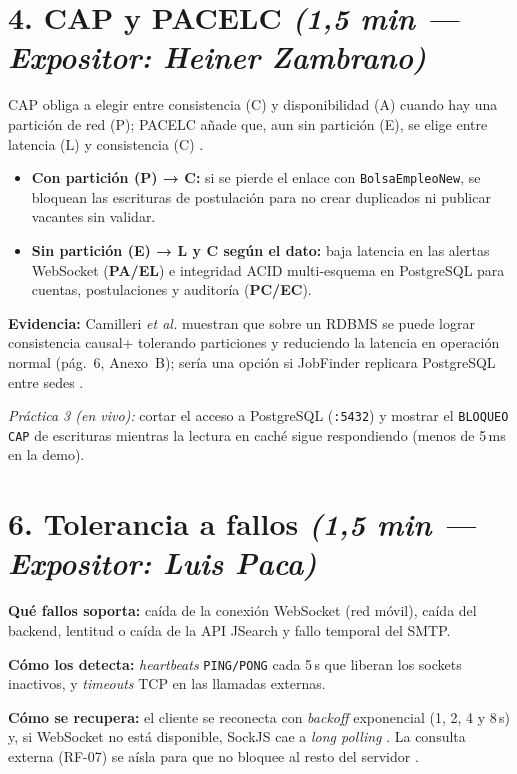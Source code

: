 \documentclass[11pt,a4paper]{article}
\newcommand{\expo}[2]{\hfill{\small\textit{(#1 — Expositor: #2)}}}
\begin{document}
\section*{4. CAP y PACELC \expo{1,5 min}{Heiner Zambrano}}
CAP obliga a elegir entre consistencia (C) y disponibilidad (A) cuando hay una
partición de red (P); PACELC añade que, aun sin partición (E), se elige entre
latencia (L) y consistencia (C) \cite{ref5}.
\begin{itemize}
  \item \textbf{Con partición (P) → C:} si se pierde el enlace con
        \texttt{BolsaEmpleoNew}, se bloquean las escrituras de postulación para no
        crear duplicados ni publicar vacantes sin validar.
  \item \textbf{Sin partición (E) → L y C según el dato:} baja latencia en las
        alertas WebSocket (\textbf{PA/EL}) e integridad ACID multi-esquema en
        PostgreSQL para cuentas, postulaciones y auditoría (\textbf{PC/EC}).
\end{itemize}
\textbf{Evidencia:} Camilleri \emph{et al.} muestran que sobre un RDBMS se puede
lograr consistencia causal+ tolerando particiones y reduciendo la latencia en
operación normal (pág.~6, Anexo~B); sería una opción si JobFinder replicara
PostgreSQL entre sedes \cite{ref5}.

\textit{Práctica 3 (en vivo):} cortar el acceso a PostgreSQL (\texttt{:5432}) y
mostrar el \texttt{BLOQUEO CAP} de escrituras mientras la lectura en caché sigue
respondiendo (menos de 5\,ms en la demo).

\section*{6. Tolerancia a fallos \expo{1,5 min}{Luis Paca}}
\textbf{Qué fallos soporta:} caída de la conexión WebSocket (red móvil), caída
del backend, lentitud o caída de la API JSearch y fallo temporal del SMTP.

\textbf{Cómo los detecta:} \textit{heartbeats} \texttt{PING/PONG} cada 5\,s que
liberan los sockets inactivos, y \textit{timeouts} TCP en las llamadas externas.

\textbf{Cómo se recupera:} el cliente se reconecta con \textit{backoff}
exponencial (1, 2, 4 y 8\,s) y, si WebSocket no está disponible, SockJS cae a
\textit{long polling} \cite{mitrovic2023websocket}. La consulta externa (RF-07) se
aísla para que no bloquee al resto del servidor \cite{ref4}.
\end{document}
